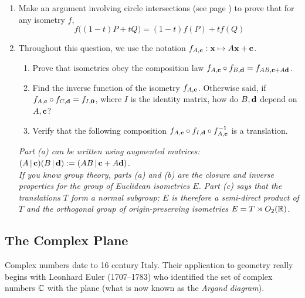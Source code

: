 \begin{exercises}
\begin{enumerate}
		
		\item Make an argument involving circle intersections (see page \pageref{affinity}) to prove that for any isometry $f$,
		\[
			f\bigl((1-t)P+tQ\bigr)=(1-t)f(P)+tf(Q)
		\]
	
	  
	  \item\label{exs:kleingroup} Throughout this question, we use the notation $f_{A,{\mathbf{c}}}:{\mathbf{x}}\mapsto A{\mathbf{x}}+{\mathbf{c}}$.
	  \begin{enumerate}
	    \item Prove that isometries obey the composition law $f_{A,{\mathbf{c}}}\circ f_{B,{\mathbf{d}}}=f_{AB,{\mathbf{c}}+A{\mathbf{d}}}$.
	    \item Find the inverse function of the isometry $f_{A,{\mathbf{c}}}$. Otherwise said, if $f_{A,{\mathbf{c}}}\circ f_{C,{\mathbf{d}}}=f_{I,{\mathbf{0}}}$, where $I$ is the identity matrix, how do $B,{\mathbf{d}}$ depend on $A,{\mathbf{c}}$?
	    \item Verify that the following composition $f_{A,{\mathbf{c}}}\circ f_{I,{\mathbf{d}}}\circ f_{A,{\mathbf{c}}}^{-1}$ is a translation.
	  \end{enumerate}
		\emph{Part (a) can be written using augmented matrices: $(A\,|\,{\mathbf{c}})(B\,|\,{\mathbf{d}}):=(AB\,|\,{\mathbf{c}}+A{\mathbf{d}})$.\\
		If you know group theory, parts (a) and (b) are the closure and inverse properties for the group of Euclidean isometries $E$. Part (c) says that the translations $T$ form a normal subgroup; $E$ is therefore a semi-direct product of $T$ and the orthogonal group of origin-preserving isometries $E=T\rtimes O_2(\mathbb{R})$.
		}
	
	\end{enumerate}
\end{exercises}

\clearpage



\subsection{The Complex Plane}\label{sec:complexplane}

Complex numbers date to 16\th{} century Italy. Their application to geometry really begins with Leonhard Euler (1707--1783) who identified the set of complex numbers $\mathbb{C}$ with the plane (what is now known as the \emph{Argand diagram}).

